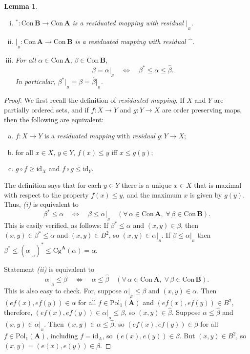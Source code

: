 \documentclass[cm,dissertation]{uhthesis}
\theoremstyle{plain}
\newtheorem{lemma}[theorem]{Lemma}
\theoremstyle{definition}
\theoremstyle{remark}
\numberwithin{theorem}{section}
\numberwithin{claim}{chapter}
\numberwithin{equation}{section}
\numberwithin{conjecture}{chapter}
\newcommand{\<}{\ensuremath{\langle}}
\renewcommand{\>}{\ensuremath{\rangle}}
\renewcommand{\leq}{\ensuremath{\leqslant}}
\renewcommand{\geq}{\ensuremath{\geqslant}}
\newcommand{\Cg}{\ensuremath{\mathrm{Cg}}}
\newcommand{\Con}{\ensuremath{\mathrm{Con\,}}}
\newcommand{\Pol}{\ensuremath{\mathrm{Pol}}}
\newcommand{\0}{\ensuremath{\mathbf{0}}}
\newcommand{\1}{\ensuremath{\mathbf{1}}}
\newcommand{\2}{\ensuremath{\mathbf{2}}}
\newcommand{\3}{\ensuremath{\mathbf{3}}}
\newcommand{\4}{\ensuremath{\mathbf{4}}}
\newcommand{\5}{\ensuremath{\mathbf{5}}}
\newcommand{\bA}{\ensuremath{\mathbf{A}}}
\newcommand{\bB}{\ensuremath{\mathbf{B}}}
\newcommand{\id}{\ensuremath{\mathrm{id}}}
\newcommand{\resB}{\ensuremath{|_{_B}}}
\newcommand{\hatmap}{\ensuremath{\widehat{\phantom{x}}}}
\begin{document}
\begin{lemma}
\label{lem:residuation-lemma}
  ~
  \begin{enumerate}[(i)]
  \item $^*: \Con\bB \rightarrow \Con\bA$ is a residuated mapping with
    residual $\resB$.
  \item $\resB : \Con\bA \rightarrow \Con\bB$ is a residuated mapping with
    residual $\hatmap$.
  \item For all $\alpha \in \Con\bA, \, \beta \in \Con\bB$,
    \[
    \beta = \alpha\resB \quad \Leftrightarrow  \quad 
    \beta^* \leq \alpha \leq \widehat{\beta}.
    \]
    In particular, 
    $\beta^*\resB = \beta = \widehat{\beta}\resB$.
  \end{enumerate}
\end{lemma}
\begin{proof}
  We first recall the definition of {\it residuated mapping}.  If $X$ and $Y$
  are partially ordered sets, and if 
  $f: X \rightarrow Y$ and 
  $g: Y \rightarrow X$ are order preserving maps, then the following are
  equivalent:
  \begin{enumerate}[(a)]
  \item $f: X \rightarrow Y$ is a {\it residuated mapping} with {\it residual}
    $g: Y \rightarrow X$;
  \item for all $x\in X,\, y\in Y$,  $f(x) \leq y$ iff $x \leq g(y)$;
  \item $g\circ f \geq \id_X$ and $f\circ g \leq \id_Y$.
  \end{enumerate}
  The definition says that for each $y\in Y$ there is a unique
  $x\in X$ that is maximal with respect to the property $f(x) \leq y$, and the
  maximum $x$ is given by $g(y)$.
  Thus, {\it (i)} is equivalent to 
  \begin{equation}
    \label{eq:OAi}
    \beta^* \leq \alpha \quad \Leftrightarrow \quad \beta \leq \alpha\resB
    \quad (\forall \, \alpha \in \Con\bA,\; \forall \, \beta \in \Con\bB).
  \end{equation}
  This is easily verified, as follows:  If 
  $\beta^* \leq \alpha$ and $(x,y)\in \beta$, then
  $(x,y) \in \beta^* \leq \alpha$ 
  and $(x,y) \in B^2$, so $(x,y)\in
  \alpha\resB$.  If $\beta \leq \alpha\resB$ then 
  $\beta^* \leq (\alpha\resB)^* \leq \Cg^\bA(\alpha) = \alpha$.

  Statement {\it (ii)} is equivalent to 
  \begin{equation}
    \label{eq:OAii}
    \alpha\resB\leq \beta 
    \quad \Leftrightarrow \quad 
    \alpha \leq \widehat{\beta}
    \quad (\forall \, \alpha \in \Con\bA,\; \forall \, \beta \in \Con\bB).
  \end{equation}
  This is also easy to check.  For, suppose
  $\alpha\resB\leq \beta$ and $(x,y)\in \alpha$. Then $(ef(x), ef(y)) \in \alpha$
  for all $f \in \Pol_1(\bA)$ and $(ef(x), ef(y)) \in B^2$, therefore, 
  $(ef(x), ef(y)) \in \alpha\resB \leq \beta$, so $(x,y) \in \widehat{\beta}$.
  Suppose $\alpha \leq \widehat{\beta}$ and $(x,y) \in \alpha\resB$. 
  Then $(x,y) \in \alpha \leq  \widehat{\beta}$, so 
  $(ef(x), ef(y)) \in \beta$ for all $f\in \Pol_1(\bA)$, including $f=\id_A$, so 
  $(e(x), e(y)) \in \beta$. But $(x, y) \in B^2$, so $(x, y) = (e(x), e(y)) \in
  \beta$.


\end{proof}
\end{document}
